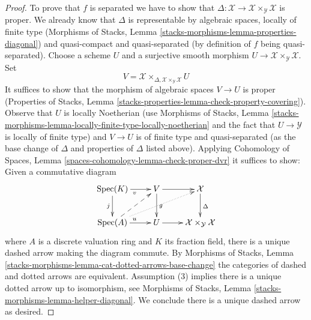 \documentclass{stacks-project}
\theoremstyle{plain}
\theoremstyle{definition}
\theoremstyle{remark}
\numberwithin{equation}{subsection}
\def\Spec{\mathop{\mathrm{Spec}}}
\begin{document}
\begin{proof}
To prove that $f$ is separated we have to show that
$\Delta : \mathcal{X} \to \mathcal{X} \times_\mathcal{Y} \mathcal{X}$
is proper. We already know that $\Delta$ is representable by
algebraic spaces, locally of finite type (Morphisms of Stacks,
Lemma \ref{stacks-morphisms-lemma-properties-diagonal}) and
quasi-compact and quasi-separated (by definition of $f$ being quasi-separated).
Choose a scheme $U$ and a surjective smooth morphism
$U \to \mathcal{X} \times_\mathcal{Y} \mathcal{X}$.
Set
$$
V = \mathcal{X} \times_{\Delta, \mathcal{X} \times_\mathcal{Y} \mathcal{X}} U
$$
It suffices to show that the morphism of algebraic spaces $V \to U$
is proper (Properties of Stacks, Lemma
\ref{stacks-properties-lemma-check-property-covering}).
Observe that $U$ is locally Noetherian
(use Morphisms of Stacks, Lemma
\ref{stacks-morphisms-lemma-locally-finite-type-locally-noetherian}
and the fact that $U \to \mathcal{Y}$ is locally of finite type)
and $V \to U$
is of finite type and quasi-separated (as the base change
of $\Delta$ and properties of $\Delta$ listed above). Applying
Cohomology of Spaces, Lemma \ref{spaces-cohomology-lemma-check-proper-dvr}
it suffices to show: Given a commutative diagram
$$
\xymatrix{
\Spec(K) \ar[r]_v \ar[d]_j &
V \ar[d]^g \ar[r] &
\mathcal{X} \ar[d]^\Delta \\
\Spec(A) \ar[r]^u \ar@{-->}[ru] \ar@{..>}[rru] &
U \ar[r] &
\mathcal{X} \times_\mathcal{Y} \mathcal{X}
}
$$
where $A$ is a discrete valuation ring and $K$ its fraction field,
there is a unique dashed arrow making the diagram commute.
By Morphisms of Stacks, Lemma
\ref{stacks-morphisms-lemma-cat-dotted-arrows-base-change}
the categories of dashed and dotted arrows are equivalent.
Assumption (3) implies there is a unique dotted arrow up to
isomorphism, see Morphisms of Stacks, Lemma
\ref{stacks-morphisms-lemma-helper-diagonal}. We conclude
there is a unique dashed arrow as desired.
\end{proof}
\end{document}
